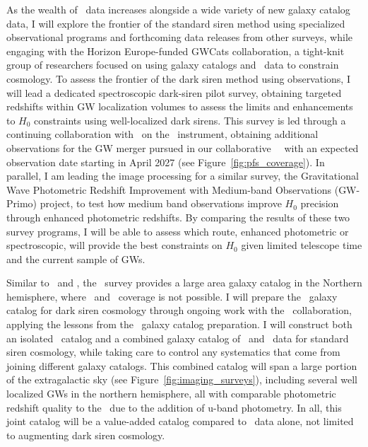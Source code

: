 As the wealth of \GW\ data increases alongside a wide variety of new galaxy catalog data, I will explore the frontier of the standard siren method using specialized observational programs and forthcoming data releases from other surveys,
while engaging with the Horizon Europe-funded GWCats collaboration, a tight-knit group of researchers focused on using galaxy catalogs and \GW\ data to constrain cosmology.
To assess the frontier of the dark siren method using observations, I will lead a dedicated spectroscopic dark-siren pilot survey, obtaining targeted redshifts within GW localization volumes to assess the limits and enhancements to $H_0$ constraints using well-localized dark sirens. This survey is led through a continuing collaboration with \JGEM\ on the \PFS\ instrument, obtaining additional observations for the GW merger pursued in our collaborative \DESGW\ \ToO\, with an expected observation date starting in April 2027 (see Figure~\ref{fig:pfs_coverage}).
In parallel, I am leading the image processing for a similar survey, the Gravitational Wave Photometric Redshift Improvement with Medium-band Observations (GW-Primo) project, to test how medium band observations improve $H_0$ precision through enhanced photometric redshifts. By comparing the results of these two survey programs, I will be able to assess which route, enhanced photometric or spectroscopic, will provide the best constraints on $H_0$ given limited telescope time and the current sample of GWs.

Similar to \DES\ and \LSST, the \UNIONS\ survey provides a large area galaxy catalog in the Northern hemisphere, where \DES\ and \LSST\ coverage is not possible. I will prepare the  \UNIONS\ galaxy catalog for dark siren cosmology through ongoing work with the \UNIONS\ collaboration, applying the lessons from the \DELVE\ galaxy catalog preparation. I will construct both an isolated \UNIONS\ catalog and a combined galaxy catalog of \UNIONS\ and \LSST\ data for standard siren cosmology, while taking care to control any systematics that come from joining different galaxy catalogs. This combined catalog will span a large portion of the extragalactic sky (see Figure~\ref{fig:imaging_surveys}), including several well localized GWs in the northern hemisphere, all with comparable photometric redshift quality to the \LSST\ due to the addition of u-band photometry. In all, this joint catalog will be a value-added catalog compared to \LSST\ data alone, not limited to augmenting dark siren cosmology.

